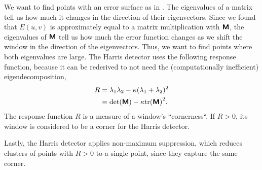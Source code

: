 We want to find points with an error surface as in
. The eigenvalues of a matrix tell us how much
it changes in the direction of their eigenvectors. Since we found that $E(u,v)$
is approximately equal to a matrix multiplication with $\bm{\mathsf{M}}$, the
eigenvalues of $\bm{\mathsf{M}}$ tell us how much the error function changes as we
shift the window in the direction of the eigenvectors. Thus, we want to find
points where both eigenvalues are large. The Harris detector uses the following
response function, because it can be rederived to not need the (computationally
inefficient) eigendecomposition,
\begin{align*}
    R & = \lambda_1\lambda_2 - \kappa (\lambda_1+\lambda_2)^2 \\
      & = \det{\tens{M}}-\kappa \tr{\tens{M}}^2.
\end{align*}
The response function $R$ is a measure of a window's ``cornerness``. If
$R>0$, its window is considered to be a corner for the Harris detector.

Lastly, the Harris detector applies non-maximum suppression, which reduces
clusters of points with $R>0$ to a single point, since they capture the same
corner.

